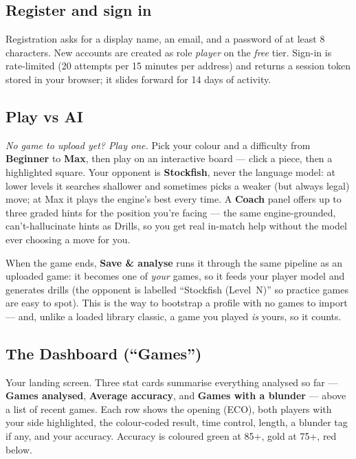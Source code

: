 \documentclass[11pt]{article}
\begin{document}
\subsection{Register and sign in}

Registration asks for a display name, an email, and a password of at least 8
characters. New accounts are created as role \emph{player} on the \emph{free}
tier. Sign-in is rate-limited (20 attempts per 15 minutes per address) and
returns a session token stored in your browser; it slides forward for 14 days
of activity.

\subsection{Play vs AI}

\emph{No game to upload yet? Play one.} Pick your colour and a difficulty from
\textbf{Beginner} to \textbf{Max}, then play on an interactive board --- click a
piece, then a highlighted square. Your opponent is \textbf{Stockfish}, never the
language model: at lower levels it searches shallower and sometimes picks a
weaker (but always legal) move; at Max it plays the engine's best every time.
A \textbf{Coach} panel offers up to three graded hints for the position you're
facing --- the same engine-grounded, can't-hallucinate hints as Drills, so you
get real in-match help without the model ever choosing a move for you.

When the game ends, \textbf{Save \& analyse} runs it through the same pipeline as
an uploaded game: it becomes one of \emph{your} games, so it feeds your player
model and generates drills (the opponent is labelled ``Stockfish (Level~N)'' so
practice games are easy to spot). This is the way to bootstrap a profile with no
games to import --- and, unlike a loaded library classic, a game you played
\emph{is} yours, so it counts.

\subsection{The Dashboard (``Games'')}

Your landing screen. Three stat cards summarise everything analysed so far ---
\textbf{Games analysed}, \textbf{Average accuracy}, and \textbf{Games with a
blunder} --- above a list of recent games. Each row shows the opening (ECO),
both players with your side highlighted, the colour-coded result, time control,
length, a blunder tag if any, and your accuracy. Accuracy is coloured green at
85+, gold at 75+, red below.
\end{document}
